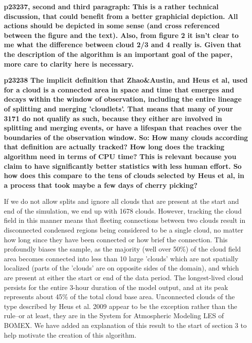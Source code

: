 \documentclass[12pt]{article}
\begin{document}
\textbf{p23237, second and third paragraph: This is a rather technical 
discussion, that could benefit from a better graphicial depiction. All actions 
should be depicted in some sense (and cross referenced between the figure and 
the text). Also, from figure 2 it isn’t clear to me what the difference between 
cloud 2/3 and 4 really is. Given that the description of the algorithm is an
important goal of the paper, more care to clarity here is necessary.}

\vspace{5mm}


\vspace{5mm}

\textbf{p23238 The implicit definition that Zhao\&Austin, and Heus et al, 
used for a cloud is a connected area in space and time that emerges and decays 
within the window of observation, including the entire lineage of splitting and
merging 'cloudlets'. That means that many of your 3171 do not qualify as such,
because they either are involved in splitting and merging events, or have a 
lifespan that reaches over the boundaries of the observation window. So: How 
many clouds according that definition are actually tracked? How long does the
tracking algorithm need in terms of CPU time? This is relevant because you 
claim to have significantly better statistics with less human effort. So how 
does this compare to the tens of clouds selected by Heus et al, in a process 
that took maybe a few days of cherry picking?}

\vspace{5mm}

If we do not allow splits and ignore all clouds that are present at the start 
and end of the simulation, we end up with 1678 clouds.  However, tracking the 
cloud field in this manner means that fleeting connections between two clouds 
result in disconnected condensed regions being considered to be a single cloud, 
no matter how long since they have been connected or how brief the connection.  
This profoundly biases the sample, as the majority (well over 50\%) of the 
cloud field area becomes connected into less than 10 large 'clouds' which are 
not spatially localized (parts of the 'clouds' are on opposite sides of the 
domain), and which are present at either the start or end of the data period. 
The longest-lived cloud persists for the entire 3-hour duration of the model 
output, and at its peak represents about 45\% of the total cloud base area.
Unconnected clouds of the type described by Heus et al. 2009 appear to be the
exception rather than the rule--or at least, they are in the System for 
Atmospheric Modeling LES of BOMEX.  We have added an explanation of this result 
to the start of section 3 to help motivate the creation of this algorithm.
\end{document}
